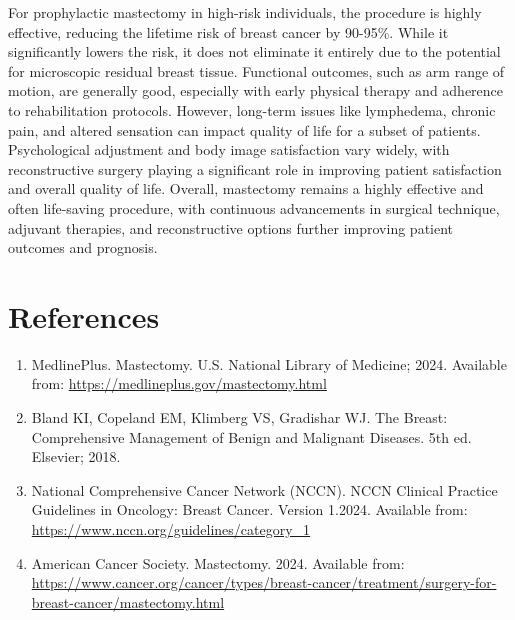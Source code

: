 For prophylactic mastectomy in high-risk individuals, the procedure is highly effective, reducing the lifetime risk of breast cancer by 90-95\%. While it significantly lowers the risk, it does not eliminate it entirely due to the potential for microscopic residual breast tissue. Functional outcomes, such as arm range of motion, are generally good, especially with early physical therapy and adherence to rehabilitation protocols. However, long-term issues like lymphedema, chronic pain, and altered sensation can impact quality of life for a subset of patients. Psychological adjustment and body image satisfaction vary widely, with reconstructive surgery playing a significant role in improving patient satisfaction and overall quality of life. Overall, mastectomy remains a highly effective and often life-saving procedure, with continuous advancements in surgical technique, adjuvant therapies, and reconstructive options further improving patient outcomes and prognosis.

\section*{References}
\begin{enumerate}
  \item MedlinePlus. Mastectomy. U.S. National Library of Medicine; 2024. Available from: \url{https://medlineplus.gov/mastectomy.html}
  \item Bland KI, Copeland EM, Klimberg VS, Gradishar WJ. The Breast: Comprehensive Management of Benign and Malignant Diseases. 5th ed. Elsevier; 2018.
  \item National Comprehensive Cancer Network (NCCN). NCCN Clinical Practice Guidelines in Oncology: Breast Cancer. Version 1.2024. Available from: \url{https://www.nccn.org/guidelines/category_1}
  \item American Cancer Society. Mastectomy. 2024. Available from: \url{https://www.cancer.org/cancer/types/breast-cancer/treatment/surgery-for-breast-cancer/mastectomy.html}
\end{enumerate}

\clearpage

